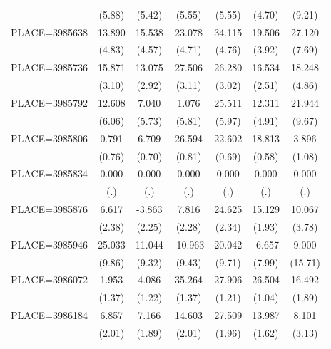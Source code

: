 {\begin{tabular}{l*{6}{c}}
                    &      (5.88)&      (5.42)&      (5.55)&      (5.55)&      (4.70)&      (9.21)\\
PLACE=3985638       &      13.890&      15.538&      23.078&      34.115&      19.506&      27.120\\
                    &      (4.83)&      (4.57)&      (4.71)&      (4.76)&      (3.92)&      (7.69)\\
PLACE=3985736       &      15.871&      13.075&      27.506&      26.280&      16.534&      18.248\\
                    &      (3.10)&      (2.92)&      (3.11)&      (3.02)&      (2.51)&      (4.86)\\
PLACE=3985792       &      12.608&       7.040&       1.076&      25.511&      12.311&      21.944\\
                    &      (6.06)&      (5.73)&      (5.81)&      (5.97)&      (4.91)&      (9.67)\\
PLACE=3985806       &       0.791&       6.709&      26.594&      22.602&      18.813&       3.896\\
                    &      (0.76)&      (0.70)&      (0.81)&      (0.69)&      (0.58)&      (1.08)\\
PLACE=3985834       &       0.000&       0.000&       0.000&       0.000&       0.000&       0.000\\
                    &         (.)&         (.)&         (.)&         (.)&         (.)&         (.)\\
PLACE=3985876       &       6.617&      -3.863&       7.816&      24.625&      15.129&      10.067\\
                    &      (2.38)&      (2.25)&      (2.28)&      (2.34)&      (1.93)&      (3.78)\\
PLACE=3985946       &      25.033&      11.044&     -10.963&      20.042&      -6.657&       9.000\\
                    &      (9.86)&      (9.32)&      (9.43)&      (9.71)&      (7.99)&     (15.71)\\
PLACE=3986072       &       1.953&       4.086&      35.264&      27.906&      26.504&      16.492\\
                    &      (1.37)&      (1.22)&      (1.37)&      (1.21)&      (1.04)&      (1.89)\\
PLACE=3986184       &       6.857&       7.166&      14.603&      27.509&      13.987&       8.101\\
                    &      (2.01)&      (1.89)&      (2.01)&      (1.96)&      (1.62)&      (3.13)\\

\end{tabular}}

